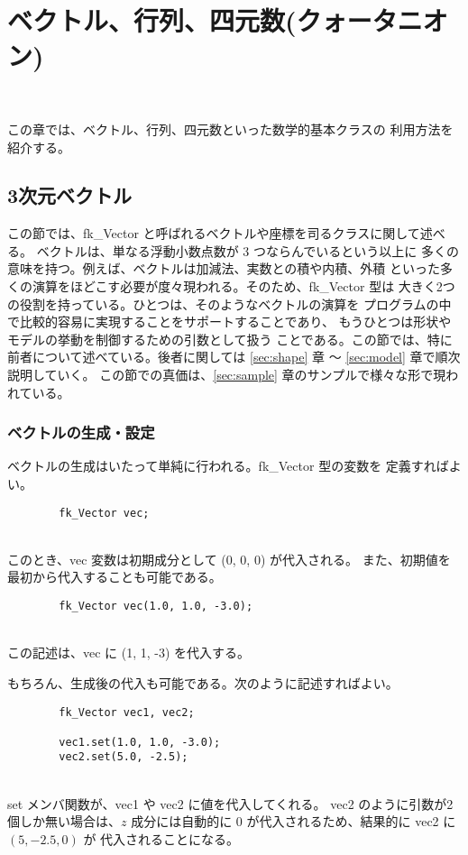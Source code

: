 \chapter{ベクトル、行列、四元数(クォータニオン)} \label{sec:vector} ~

この章では、ベクトル、行列、四元数といった数学的基本クラスの
利用方法を紹介する。

\section{3次元ベクトル}
この節では、fk\_Vector と呼ばれるベクトルや座標を司るクラスに関して述べる。
ベクトルは、単なる浮動小数点数が 3 つならんでいるという以上に
多くの意味を持つ。例えば、ベクトルは加減法、実数との積や内積、外積
といった多くの演算をほどこす必要が度々現われる。そのため、fk\_Vector 型は
大きく2つの役割を持っている。ひとつは、そのようなベクトルの演算を
プログラムの中で比較的容易に実現することをサポートすることであり、
もうひとつは形状やモデルの挙動を制御するための引数として扱う
ことである。この節では、特に前者について述べている。後者に関しては
\ref{sec:shape} 章 〜 \ref{sec:model} 章で順次説明していく。
この節での真価は、\ref{sec:sample} 章のサンプルで様々な形で現われている。

\subsection{ベクトルの生成・設定}
ベクトルの生成はいたって単純に行われる。fk\_Vector 型の変数を
定義すればよい。
\\
\begin{screen}
\begin{verbatim}
        fk_Vector vec;
\end{verbatim}
\end{screen}
~ \\
このとき、vec 変数は初期成分として (0, 0, 0) が代入される。
また、初期値を最初から代入することも可能である。
\\
\begin{screen}
\begin{verbatim}
        fk_Vector vec(1.0, 1.0, -3.0);
\end{verbatim}
\end{screen}
~ \\
この記述は、vec に (1, 1, -3) を代入する。

もちろん、生成後の代入も可能である。次のように記述すればよい。
\\
\begin{screen}
\begin{verbatim}
        fk_Vector vec1, vec2;

        vec1.set(1.0, 1.0, -3.0);
        vec2.set(5.0, -2.5);
\end{verbatim}
\end{screen}
~ \\
set メンバ関数が、vec1 や vec2 に値を代入してくれる。
vec2 のように引数が2個しか無い場合は、\(z\) 成分には自動的に
\(0\) が代入されるため、結果的に vec2 に \((5, -2.5, 0)\) が
代入されることになる。

